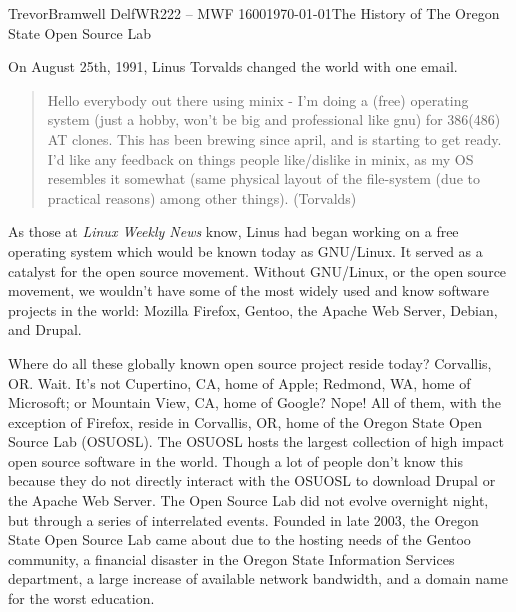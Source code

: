 \documentclass[12pt,letterpaper]{article}
\begin{document}
\begin{mla}{Trevor}{Bramwell}
{Delf}{WR222 -- MWF 1600}{\today}{The History of The Oregon
    State Open Source Lab}

On August 25th, 1991, Linus Torvalds changed the world with one email. 
\begin{quotation}
Hello everybody out there using minix - 
I'm doing a (free) operating system (just a hobby, won't be big and 
professional like gnu) for 386(486) AT clones.  This has been brewing 
since april, and is starting to get ready.  I'd like any feedback on 
things people like/dislike in minix, as my OS resembles it somewhat 
(same physical layout of the file-system (due to practical reasons) 
among other things). (Torvalds) 
\end{quotation}
As those at \emph{Linux Weekly News} know, Linus had
began working on a free operating system which would be known today as
GNU/Linux. It served as a catalyst for the open source movement. Without
GNU/Linux, or the open source movement, we wouldn't have some of the most 
widely used and know software projects in the world: Mozilla Firefox, Gentoo, 
the Apache Web Server, Debian, and Drupal.

Where do all these globally known open source project reside today? 
Corvallis, OR.
Wait. It's not Cupertino, CA, home of Apple; Redmond, WA, home of Microsoft;
or Mountain View, CA, home of Google? Nope! All of them, with the exception of
Firefox, reside in Corvallis, OR, home of the Oregon State Open Source Lab 
(OSUOSL).
The OSUOSL hosts the largest collection of high impact open source software in 
the world. Though a lot of people don't know this because they do not directly
interact with the OSUOSL to download Drupal or the Apache Web Server.
The Open Source Lab did not evolve overnight night, but through a series of 
interrelated events. %
Founded in
late 2003, the Oregon State Open Source Lab came about due to the hosting 
needs of the
Gentoo community, a financial disaster in the Oregon State Information Services
department, a large increase of available network bandwidth, and a domain name 
for the worst education.


\end{mla}
\end{document}
